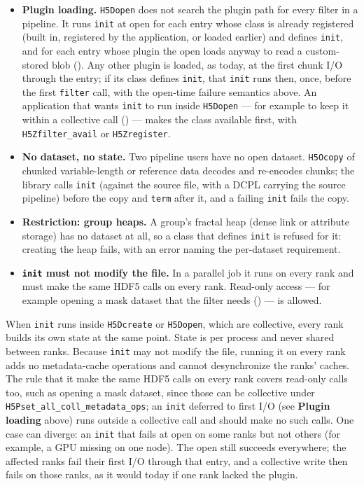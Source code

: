 \documentclass[../RFC-HDFG-2026-003.tex]{subfiles}
\begin{document}
\begin{itemize}
  \texttt{init} needs.
\item \textbf{Plugin loading.}  \texttt{H5Dopen} does not search the
  plugin path for every filter in a pipeline.  It runs \texttt{init} at
  open for each entry whose class is already registered (built in,
  registered by the application, or loaded earlier) and defines
  \texttt{init}, and for each entry whose plugin the open loads anyway to
  read a custom-stored blob ().  Any other
  plugin is loaded, as today, at the first chunk I/O through the entry;
  if its class defines \texttt{init}, that \texttt{init} runs then, once,
  before the first \texttt{filter} call, with the open-time failure
  semantics above.  An application that wants \texttt{init} to run inside
  \texttt{H5Dopen} --- for example to keep it within a collective call
  () --- makes the class available
  first, with \texttt{H5Zfilter\_avail} or \texttt{H5Zregister}.
\item \textbf{No dataset, no state.}  Two pipeline users have no open
  dataset.  \texttt{H5Ocopy} of chunked variable-length or reference data
  decodes and re-encodes chunks; the library calls \texttt{init} (against
  the source file, with a DCPL carrying the source pipeline) before the
  copy and \texttt{term} after it, and a failing \texttt{init} fails the
  copy.
\item \textbf{Restriction: group heaps.}  A group's fractal heap
  (dense link or attribute storage) has no dataset at all, so a class
  that defines \texttt{init} is refused for it: creating the heap fails,
  with an error naming the per-dataset requirement.
\item \textbf{\texttt{init} must not modify the file.}  In a parallel job
  it runs on every rank and must make the same HDF5 calls on every rank.
  Read-only access --- for example opening a mask dataset that the filter
  needs () --- is allowed.
\end{itemize}

\label{sec:filter-state-parallel}

When \texttt{init} runs inside \texttt{H5Dcreate} or \texttt{H5Dopen},
which are collective, every rank builds its own state at the same point.
State is per process and never shared between ranks.  Because
\texttt{init} may not modify the file, running it on every rank adds no
metadata-cache operations and cannot desynchronize the ranks' caches.
The rule that it make the same HDF5 calls on every rank covers read-only
calls too, such as opening a mask dataset, since those can be collective
under \texttt{H5Pset\_all\_coll\_metadata\_ops}; an \texttt{init}
deferred to first I/O (see \textbf{Plugin loading} above) runs outside a
collective call and should make no such calls.  One case can diverge: an
\texttt{init} that fails at open on some ranks but not others (for
example, a GPU missing on one node).  The open still succeeds everywhere;
the affected ranks fail their first I/O through that entry, and a
collective write then fails on those ranks, as it would today if one rank
lacked the plugin.
\end{document}
